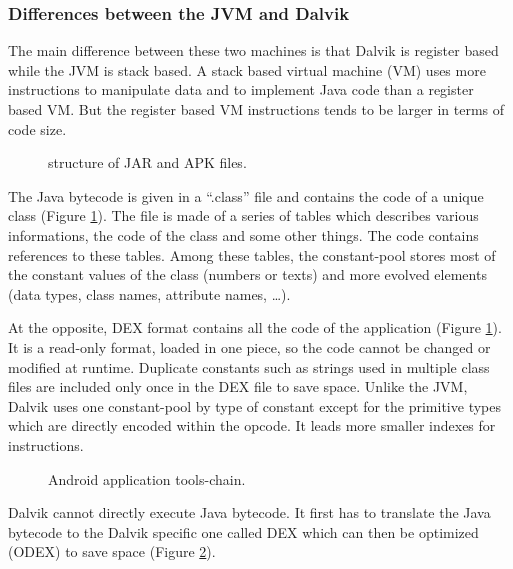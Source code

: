 \documentclass{sig-alternate}
\def \DALVIK{Dalvik\xspace}
\def \ANDROID{Android\xspace}
\def \JVM{JVM\xspace}
\def \DEX{DEX\xspace}
\begin{document}
    \subsubsection{Differences between the JVM and \DALVIK}

      The main difference between these two machines is that \DALVIK is register based while the \JVM is stack based.
      A stack based virtual machine (VM) uses more instructions to manipulate data and to implement Java code than a register based VM.
      But the register based VM instructions tends to be larger in terms of code size\cite{ieee-paul-kundu-energy-perspective}.

      \begin{figure}[!h]
        \centering \resizebox{\linewidth}{!}{}
        \caption{structure of JAR and APK files.}
        \label{SJA}
      \end{figure}

      The Java bytecode is given in a ``.class'' file and contains the code of a unique class (Figure \ref{SJA}).
      The file is made of a series of tables which describes various informations, the code of the class and some other things.
      The code contains references to these tables.
      Among these tables, the constant-pool stores most of the constant values of the class (numbers or texts)
      and more evolved elements (data types, class names, attribute names, \dots).

      At the opposite, \DEX format contains all the code of the application (Figure \ref{SJA}).
      It is a read-only format, loaded in one piece, so the code cannot be changed or modified at runtime.
      Duplicate constants such as strings used in multiple class files
      are included only once in the \DEX file to save space.
      Unlike the \JVM, \DALVIK uses one constant-pool by type of constant
      except for the primitive types which are directly encoded within the opcode.
      It leads more smaller indexes for instructions.\\

      \begin{figure}[!h]
        \centering \resizebox{\linewidth}{!}{}
        \caption{\ANDROID application tools-chain.}
        \label{DTC}
      \end{figure}

      \DALVIK cannot directly execute Java bytecode.
      It first has to translate the Java bytecode to the \DALVIK specific one called \DEX
      which can then be optimized (\mbox{ODEX}) to save space (Figure \ref{DTC}).
\end{document}
